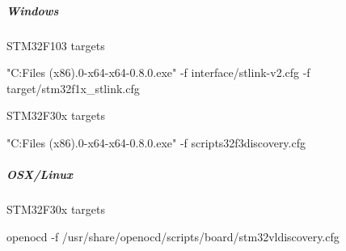 \subparagraph*{Windows}

S\+T\+M32\+F103 targets \begin{DoxyVerb}"C:\Program Files (x86)\UTILS{}.0\bin-x64\openocd-x64-0.8.0.exe" -f interface/stlink-v2.cfg -f target/stm32f1x_stlink.cfg
\end{DoxyVerb}


S\+T\+M32\+F30x targets \begin{DoxyVerb}"C:\Program Files (x86)\UTILS{}.0\bin-x64\openocd-x64-0.8.0.exe" -f scripts\board\stm32f3discovery.cfg
\end{DoxyVerb}


\subparagraph*{O\+S\+X/\+Linux}

S\+T\+M32\+F30x targets \begin{DoxyVerb}  openocd -f /usr/share/openocd/scripts/board/stm32vldiscovery.cfg\end{DoxyVerb}
 